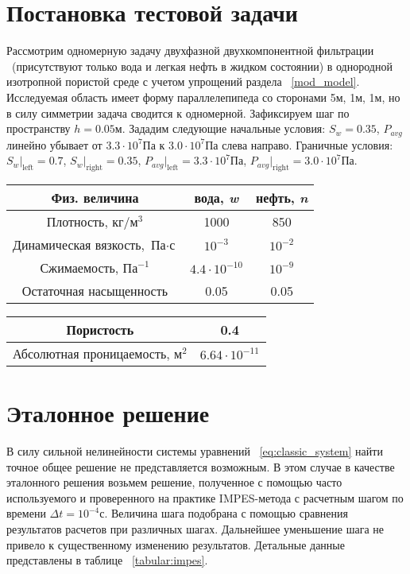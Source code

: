 \section{Постановка тестовой задачи}
\label{test_task}
Рассмотрим одномерную задачу двухфазной двухкомпонентной фильтрации ~(присутствуют только вода и легкая нефть в жидком состоянии)
в однородной изотропной пористой среде с учетом упрощений раздела ~\ref{mod_model}.
Исследуемая область имеет форму параллелепипеда со сторонами 5м, 1м, 1м, но в силу симметрии задача сводится к одномерной.
Зафиксируем шаг по пространству $h=0.05\text{м}$.
Зададим следующие начальные условия: $S_w = 0.35$, $P_{avg}$ линейно убывает от $3.3\cdot 10^7$Па к $3.0\cdot 10^7$Па слева направо.
Граничные условия: $S_w|_{\text{left}} = 0.7$, $S_w|_{\text{right}} = 0.35$,
$P_{avg}|_{\text{left}} = 3.3\cdot 10^7$Па, $P_{avg}|_{\text{right}} = 3.0\cdot 10^7$Па.

\begin{table}[H]
\begin{center}
\begin{tabular}{|c|c|c|}
\hline
Физ. величина & вода, \textit {w} & нефть, \textit {n} \\
\hline
Плотность,  $ {\text{кг}} / {\text{м}^3} $ & 1000 & 850 \\
\hline
Динамическая вязкость, $ \text{Па} \cdot \text{с} $ & $10^{-3}$ & $10^{-2}$ \\
\hline
Сжимаемость, $ \text{Па}^{-1}$ & $4.4 \cdot 10^{-10}$ & $10^{-9}$ \\
\hline
Остаточная насыщенность & 0.05 & 0.05 \\
\hline
\end{tabular}
\label{tabular:liquids}
\end{center}
\end{table}

\begin{table}[H]
\begin{center}
\begin{tabular}{|c|c|}
\hline
Пористость & 0.4\\
\hline
Абсолютная проницаемость, $ \text{м}^{2}$ & $6.64 \cdot 10^{-11}$ \\
\hline
\end{tabular}
\label{tabular:medium}
\end{center}
\end{table}


\section{Эталонное решение}
\label{reference sample}
В силу сильной нелинейности системы уравнений ~\eqref{eq:classic_system} найти точное общее решение не представляется возможным.
В этом случае в качестве эталонного решения возьмем решение, полученное с помощью часто используемого и проверенного на практике IMPES-метода с расчетным шагом по
времени $\Delta t = 10^{-4}\text{с}$. Величина шага подобрана с помощью сравнения результатов расчетов при различных шагах.
Дальнейшее уменьшение шага не привело к существенному изменению результатов. Детальные данные представлены в таблице ~\ref{tabular:impes}.

